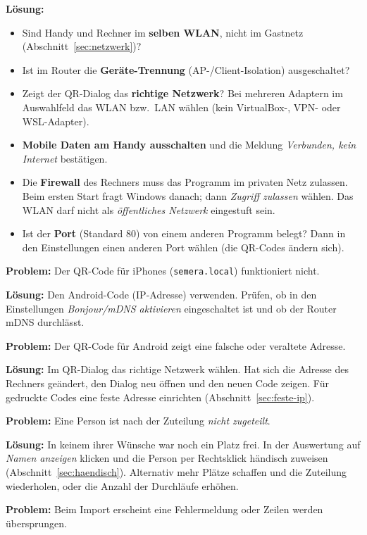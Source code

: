 \documentclass[a4paper,11pt]{article}
\begin{document}
\textbf{Lösung:}\par\nopagebreak
\begin{itemize}
  \item Sind Handy und Rechner im \textbf{selben WLAN}, nicht im Gastnetz (Abschnitt~\ref{sec:netzwerk})?
  \item Ist im Router die \textbf{Geräte-Trennung} (AP-/Client-Isolation) ausgeschaltet?
  \item Zeigt der QR-Dialog das \textbf{richtige Netzwerk}? Bei mehreren Adaptern im Auswahlfeld das WLAN bzw.\ LAN wählen
  (kein VirtualBox-, VPN- oder WSL-Adapter).
  \item \textbf{Mobile Daten am Handy ausschalten} und die Meldung \emph{Verbunden, kein Internet} bestätigen.
  \item Die \textbf{Firewall} des Rechners muss das Programm im privaten Netz zulassen. Beim ersten Start fragt Windows
  danach; dann \emph{Zugriff zulassen} wählen. Das WLAN darf nicht als \emph{öffentliches Netzwerk} eingestuft sein.
  \item Ist der \textbf{Port} (Standard 80) von einem anderen Programm belegt? Dann in den Einstellungen einen anderen Port
  wählen (die QR-Codes ändern sich).
\end{itemize}

\textbf{Problem:} Der QR-Code für iPhones (\texttt{semera.local}) funktioniert nicht.

\textbf{Lösung:} Den Android-Code (IP-Adresse) verwenden. Prüfen, ob in den Einstellungen \emph{Bonjour/mDNS aktivieren}
eingeschaltet ist und ob der Router mDNS durchlässt.

\textbf{Problem:} Der QR-Code für Android zeigt eine falsche oder veraltete Adresse.

\textbf{Lösung:} Im QR-Dialog das richtige Netzwerk wählen. Hat sich die Adresse des Rechners geändert, den Dialog neu
öffnen und den neuen Code zeigen. Für gedruckte Codes eine feste Adresse einrichten (Abschnitt~\ref{sec:feste-ip}).

\textbf{Problem:} Eine Person ist nach der Zuteilung \emph{nicht zugeteilt}.

\textbf{Lösung:} In keinem ihrer Wünsche war noch ein Platz frei. In der Auswertung auf \emph{Namen anzeigen} klicken
und die Person per Rechtsklick händisch zuweisen (Abschnitt~\ref{sec:haendisch}). Alternativ mehr Plätze schaffen und die
Zuteilung wiederholen, oder die Anzahl der Durchläufe erhöhen.

\textbf{Problem:} Beim Import erscheint eine Fehlermeldung oder Zeilen werden übersprungen.
\end{document}
